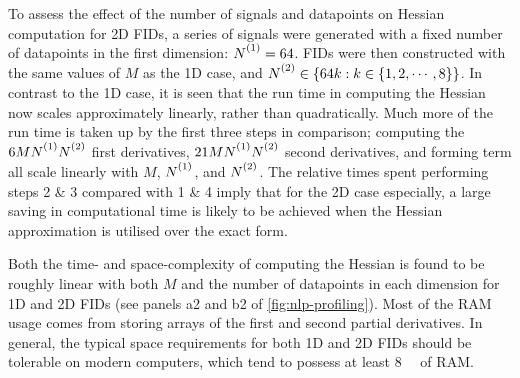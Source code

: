 To assess the effect of the number of signals and datapoints on Hessian
computation for \ac{2D} \acp{FID}, a series of signals were generated with a
fixed number of datapoints in the first dimension: $\None = 64$. \acp{FID} were
then constructed with the same values of $M$ as the \ac{1D} case, and $\Ntwo
\in \lbrace 64k : k \in \lbrace 1, 2, \cdots, 8 \rbrace \rbrace$. In contrast to
the \ac{1D} case, it is seen that the run time in computing the Hessian now
scales approximately linearly, rather than quadratically. Much more of the run
time is taken up by the first three steps in comparison; computing the
$6M\None\Ntwo$ first derivatives, $21M\None\Ntwo$ second derivatives, and
forming term  all scale linearly with $M$, $\None$, and $\Ntwo$. The
relative times spent performing steps 2 \& 3 compared with 1 \& 4 imply that for
the \ac{2D} case especially, a large saving in computational time is likely to be
achieved when the Hessian approximation is utilised over the exact form.

Both the time- and space-complexity of computing the Hessian is found to be
roughly linear with both $M$ and the number of datapoints in each dimension
for \ac{1D} and \ac{2D} \acp{FID} (see panels a2 and b2 of
\cref{fig:nlp-profiling}). Most of the \ac{RAM} usage comes from storing arrays
of the first and second partial derivatives. In general, the typical space
requirements for both \ac{1D} and \ac{2D} \acp{FID} should be tolerable on
modern computers, which tend to possess at least \qty{8}{\gibi\byte} of
\ac{RAM}.
